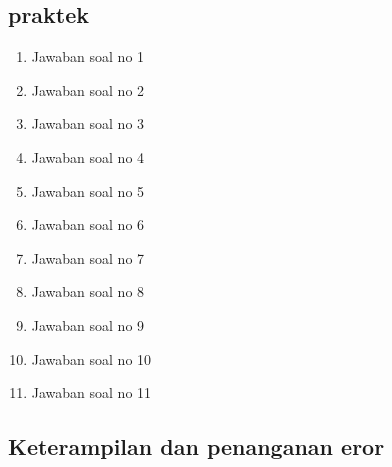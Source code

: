 \subsection{praktek}
\begin{enumerate}
    \item Jawaban soal no 1
    
    \item Jawaban soal no 2
    
    \item Jawaban soal no 3
    
    \item Jawaban soal no 4
    
    \item Jawaban soal no 5
    
    \item Jawaban soal no 6
    
    \item Jawaban soal no 7
    
    \item Jawaban soal no 8
    
    \item Jawaban soal no 9
    
    \item Jawaban soal no 10
    
    \item Jawaban soal no 11
    
\end{enumerate}

\subsection{Keterampilan dan penanganan eror}
    
